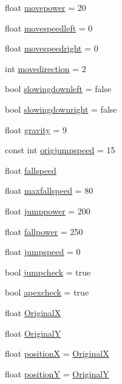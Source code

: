 \begin{DoxyCompactItemize}
\item 
float \hyperlink{classPrincessObject_aab72067b2b7b084a67c3b9721bf55123}{movepower} = 20
\item 
float \hyperlink{classPrincessObject_a079a33404f9353bb1da4b7d56bbdb23f}{movespeedleft} = 0
\item 
float \hyperlink{classPrincessObject_aa36726b24708bce76574c43fdd281d4f}{movespeedright} = 0
\item 
int \hyperlink{classPrincessObject_a15438cd744677b00661e1e13165f44fb}{movedirection} = 2
\item 
bool \hyperlink{classPrincessObject_a48ad71b9b57a16ca7fc293b915030427}{slowingdownleft} = false
\item 
bool \hyperlink{classPrincessObject_a1898fcebf9a59d2c445b44f46f3651aa}{slowingdownright} = false
\item 
float \hyperlink{classPrincessObject_a9d28581d48f94b6f4914921231b4588d}{gravity} = 9
\item 
const int \hyperlink{classPrincessObject_a0d83126222c2eb30007a8731cc8f9dc1}{origjumpspeed} = 15
\item 
float \hyperlink{classPrincessObject_a4a7eba961aedd50e46a53cb02aa87f9b}{fallspeed}
\item 
float \hyperlink{classPrincessObject_a7edc5c5b0a1151892b5734a5bd45cf3e}{maxfallspeed} = 80
\item 
float \hyperlink{classPrincessObject_a5998e01a878a2a26e87ef67e09dddea7}{jumppower} = 200
\item 
float \hyperlink{classPrincessObject_ad9fbc5d3480baafefa0db06d2e38c423}{fallpower} = 250
\item 
float \hyperlink{classPrincessObject_a45e94368012495c43c75afc84f699e36}{jumpspeed} = 0
\item 
bool \hyperlink{classPrincessObject_a70b6fd942174a1bb7315cd2d1ff0f214}{jumpcheck} = true
\item 
bool \hyperlink{classPrincessObject_ab7e762d0cd4f1a128b4bb0f53426b587}{apexcheck} = true
\item 
float \hyperlink{classPrincessObject_a42095ab9d816790313c5309402ee3d63}{OriginalX}
\item 
float \hyperlink{classPrincessObject_a46a4701d6804ce96d10507e5f99579d8}{OriginalY}
\item 
float \hyperlink{classPrincessObject_a99b266ed47e77df2d3d85c46c70ceecc}{positionX} = \hyperlink{classPrincessObject_a42095ab9d816790313c5309402ee3d63}{OriginalX}
\item 
float \hyperlink{classPrincessObject_a1a68af2f41e5446cff1f33473eb4bfa6}{positionY} = \hyperlink{classPrincessObject_a46a4701d6804ce96d10507e5f99579d8}{OriginalY}

\end{DoxyCompactItemize}
